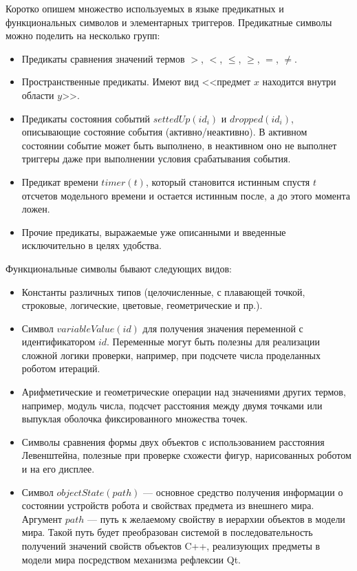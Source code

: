 \documentclass[conference]{IEEEtran}
\begin{document}
Коротко опишем множество используемых в языке предикатных и функциональных символов и элементарных триггеров. Предикатные символы можно поделить на несколько групп:
\begin{itemize}
    \item Предикаты сравнения значений термов $>$, $<$, $\leq$, $\geq$, $=$, $\neq$.
    \item Пространственные предикаты. Имеют вид <<предмет $x$ находится внутри области $y$>>.
    \item Предикаты состояния событий $settedUp(id_i)$ и $dropped(id_i)$, описывающие состояние события 
            (активно/неактивно). В активном состоянии событие может быть выполнено, в неактивном оно не выполнет триггеры даже при выполнении условия срабатывания события.
    \item Предикат времени $timer(t)$, который становится истинным спустя $t$ отсчетов модельного времени и остается истинным после, а до этого момента ложен.
    \item Прочие предикаты, выражаемые уже описанными и введенные исключительно в целях удобства.
\end{itemize}

Функциональные символы бывают следующих видов:
\begin{itemize}
    \item Константы различных типов (целочисленные, с плавающей точкой, строковые, логические, цветовые, геометрические и пр.).
    \item Символ $variableValue(id)$ для получения значения переменной с идентификатором $id$. Переменные могут быть полезны для реализации сложной логики проверки, например, при подсчете числа проделанных роботом итераций.
    \item Арифметические и геометрические операции над значениями других термов, например, модуль числа, подсчет расстояния между двумя точками или выпуклая оболочка фиксированного множества точек.
    \item Символы сравнения формы двух объектов с использованием расстояния Левенштейна, полезные при проверке схожести фигур, нарисованных роботом и на его дисплее.
    \item Символ $objectState(path)$ --- основное средство получения информации о состоянии устройств робота и свойствах предмета из внешнего мира. Аргумент $path$ --- путь к желаемому свойству в иерархии объектов в модели мира. Такой путь будет преобразован системой в последовательность получений значений свойств объектов C++, реализующих предметы в модели мира посредством механизма рефлексии Qt.
\end{itemize}
\end{document}
